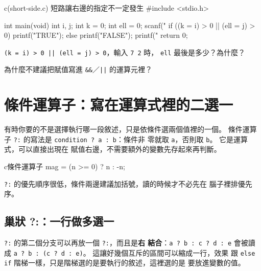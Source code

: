 \begin{example}{c}{(short-side.c) 短路讓右邊的指定不一定發生}
#include <stdio.h>

int main(void) {
    int i, j;
    int k = 0;
    int ell = 0;
    scanf("%
    if ((k = i) > 0 || (ell = j) > 0) {
        printf("TRUE\n");
    } else {
        printf("FALSE\n");
    }
    printf("%
    return 0;
}
\end{example}



\begin{drills}[label=drills:cond-short-circuit-assign]
\item \texttt{(k = i) > 0 || (ell = j) > 0}，輸入 \texttt{7 2} 時，
\texttt{ell} 最後是多少？為什麼？
\item 為什麼不建議把賦值寫進 \texttt{\&\&}／\texttt{||} 的運算元裡？
\end{drills}

\section{條件運算子：寫在運算式裡的二選一}
\label{sec:cond-ternary}

有時你要的不是選擇執行哪一段敘述，只是依條件選兩個值裡的一個。
條件運算子 \texttt{?:} 的寫法是 \texttt{condition ? a : b}：條件非
零就取 \texttt{a}，否則取 \texttt{b}。 它是運算式，可以直接出現在
賦值右邊，不需要額外的變數先存起來再判斷。

\begin{code}{c}{條件運算子}
mag = (n >= 0) ? n : -n;
\end{code}

\texttt{?:} 的優先順序很低，條件兩邊建議加括號，讀的時候才不必先在
腦子裡排優先序。

\subsection{巢狀 ?:：一行做多選一}

\texttt{?:} 的第二個分支可以再放一個 \texttt{?:}，而且是\textbf{右
結合}：\texttt{a ? b : c ? d : e} 會被讀成
\texttt{a ? b : (c ? d : e)}。 這讓好幾個互斥的區間可以縮成一行，效果
跟 \texttt{else if} 階梯一樣，只是階梯選的是要執行的敘述，這裡選的是
要放進變數的值。

